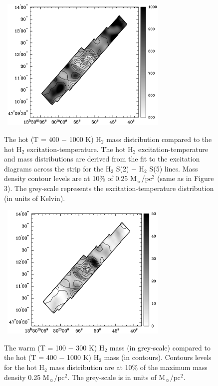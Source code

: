 \documentclass[manuscript]{aastex}
\begin{document}
\clearpage
\begin{figure}[!h]
\centerline{\hbox{\hspace{0.0in}
\includegraphics[width=8cm,angle=0]{bw_hot_h2.jpg}}}
\caption{The hot (T = 400 $-$ 1000 K) $\mathrm{H_2}$ mass distribution compared to the hot $\mathrm{H_2}$ excitation-temperature.  The hot $\mathrm{H_2}$ excitation-temperature and mass distributions are derived from the fit to the excitation diagrams across the strip for the $\mathrm{H_2}$ S(2) $-$ $\mathrm{H_2}$ S(5) lines.  Mass density contour levels are at 10\% of 0.25 $\mathrm{M_\sun}$/$\mathrm{pc^2}$ (same as in Figure 3). 
The grey-scale represents the excitation-temperature distribution (in units of Kelvin).  %
\label{fig5}}
\end{figure}

\clearpage
\begin{figure}[!h]
\centerline{\hbox{\hspace{0.0in}
\includegraphics[width=8cm,angle=0]{bw_warm_v_hot.jpg}}}
\caption{The warm (T = 100 $-$ 300 K) $\mathrm{H_2}$ mass (in grey-scale) compared to the hot (T = 400 $-$ 1000 K) $\mathrm{H_2}$ mass (in contours).  Contours levels for the hot $\mathrm{H_2}$ mass distribution are at 10\% of the maximum mass density 0.25 $\mathrm{M_\sun}$/$\mathrm{pc^2}$. 
The grey-scale is in units of $\mathrm{M_\sun}$/$\mathrm{pc^2}$.
\label{fig6}}
\end{figure}
\end{document}
